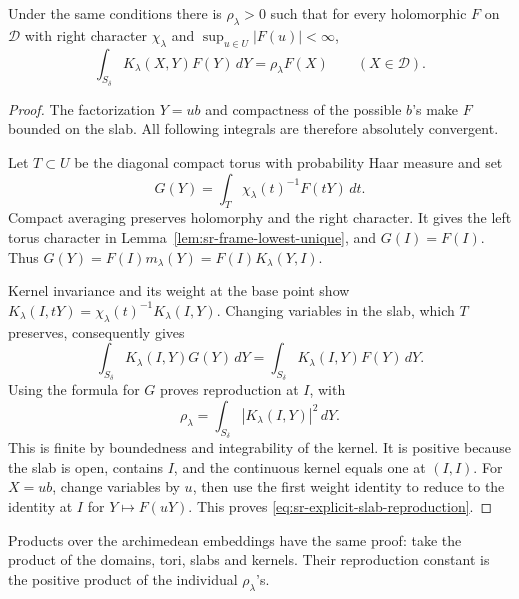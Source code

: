 \begin{srproposition}
\label{prop:sr-frame-slab-reproducing}
Under the same conditions there is \(\rho_\lambda>0\) such that
for every holomorphic \(F\) on \(\mathcal D\) with right
character \(\chi_\lambda\) and
\(\sup_{u\in U}|F(u)|<\infty\),
\begin{equation}\label{eq:sr-explicit-slab-reproduction}
 \int_{S_\delta}K_\lambda(X,Y)F(Y)\,dY
                 =\rho_\lambda F(X)\qquad(X\in\mathcal D).
\end{equation}
\end{srproposition}

\begin{proof}
The factorization \(Y=ub\) and compactness of the possible \(b\)'s
make \(F\) bounded on the slab.
All following integrals are therefore absolutely convergent.

Let \(T\subset U\) be the diagonal compact torus with probability
Haar measure and set
\[
 G(Y)=\int_T\chi_\lambda(t)^{-1}F(tY)\,dt .
\]
Compact averaging preserves holomorphy and the right character.
It gives the left torus character in
Lemma~\ref{lem:sr-frame-lowest-unique}, and \(G(I)=F(I)\).
Thus \(G(Y)=F(I)m_\lambda(Y)=F(I)K_\lambda(Y,I)\).

Kernel invariance and its weight at the base point show
\(K_\lambda(I,tY)=\chi_\lambda(t)^{-1}K_\lambda(I,Y)\).
Changing variables in the slab, which \(T\) preserves, consequently
gives
\[
 \int_{S_\delta}K_\lambda(I,Y)G(Y)\,dY
       =\int_{S_\delta}K_\lambda(I,Y)F(Y)\,dY .
\]
Using the formula for \(G\) proves reproduction at \(I\), with
\[
 \rho_\lambda=\int_{S_\delta}|K_\lambda(I,Y)|^2\,dY .
\]
This is finite by boundedness and integrability of the kernel.
It is positive because the slab is open, contains \(I\), and the
continuous kernel equals one at \((I,I)\).
For \(X=ub\), change variables by \(u\), then use the first
weight identity to reduce to the identity at \(I\) for
\(Y\mapsto F(uY)\).  This proves
\eqref{eq:sr-explicit-slab-reproduction}.
\end{proof}

Products over the archimedean embeddings have the same proof:
take the product of the domains, tori, slabs and kernels.
Their reproduction constant is the positive product of the
individual \(\rho_\lambda\)'s.

